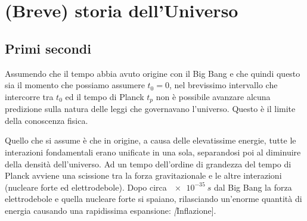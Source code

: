 \section{(Breve) storia dell'Universo}\label{sec:storia-universo}
\subsection{Primi secondi}\label{primi-secondi}
Assumendo che il tempo abbia avuto origine con il Big Bang e che quindi questo sia il momento che possiamo assumere $t_0=0$, nel brevissimo intervallo che intercorre tra $t_0$ ed il tempo di Planck $t_p$ non è possibile avanzare alcuna predizione sulla natura delle leggi che governavano l'universo. Questo è il limite della conoscenza fisica.

Quello che si assume è che in origine, a causa delle elevatissime energie, tutte le interazioni fondamentali erano unificate in una sola, separandosi poi al diminuire della densità dell'universo. Ad un tempo dell'ordine di grandezza del tempo di Planck avviene una scissione tra la forza gravitazionale e le altre interazioni (nucleare forte ed elettrodebole). Dopo circa $\SI{e-35}{s}$ dal Big Bang la forza elettrodebole e quella nucleare forte si spaiano, rilasciando un'enorme quantità di energia causando una rapidissima espansione: \textit[Inflazione].